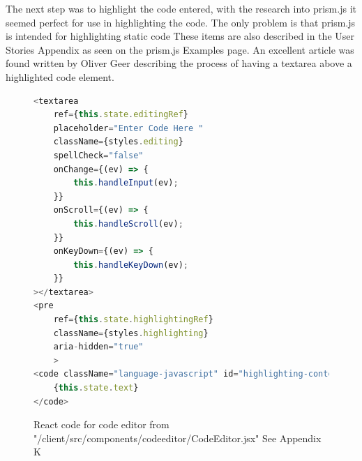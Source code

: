 The next step was to highlight the code entered, with the research into prism.js \cite{prism} it seemed perfect for use
in highlighting the code. The only problem is that prism.js is intended for highlighting static code
These items are also described in the User Stories Appendix as seen on the prism.js Examples page. An excellent article was found written by
Oliver Geer \cite{olivergeer} describing the process of having a textarea above a highlighted code element.

\begin{figure}[h]
    \begin{lstlisting}[language=Javascript]
<textarea
    ref={this.state.editingRef}
    placeholder="Enter Code Here "
    className={styles.editing}
    spellCheck="false"
    onChange={(ev) => {
        this.handleInput(ev);
    }}
    onScroll={(ev) => {
        this.handleScroll(ev);
    }}
    onKeyDown={(ev) => {
        this.handleKeyDown(ev);
    }}
></textarea>
<pre
    ref={this.state.highlightingRef}
    className={styles.highlighting}
    aria-hidden="true"
    >
<code className="language-javascript" id="highlighting-content">
    {this.state.text}
</code>
    \end{lstlisting}
    \caption{React code for code editor from "/client/src/components/code\textunderscore{}editor/CodeEditor.jsx" See Appendix K}
    \label{fig:react-codeeditor}
\end{figure}

